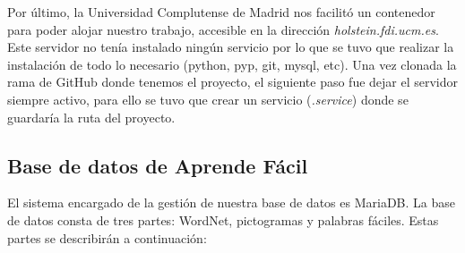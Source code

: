 Por último, la Universidad Complutense de Madrid nos facilitó un contenedor para poder alojar nuestro trabajo, accesible en la dirección \textit{holstein.fdi.ucm.es}. Este servidor no tenía instalado ningún servicio por lo que se tuvo que realizar la instalación de todo lo necesario (python, pyp, git, mysql, etc). Una vez clonada la rama de GitHub donde tenemos el proyecto, el siguiente paso fue dejar el servidor siempre activo, para ello se tuvo que crear un servicio (\textit{.service}) donde se guardaría la ruta del proyecto.

\subsection{Base de datos de Aprende Fácil}
\label{cap:subsec:database}

 El sistema encargado de la gestión de nuestra base de datos es MariaDB. La base de datos consta de tres partes: WordNet, pictogramas y palabras fáciles. Estas partes se describirán a continuación:



